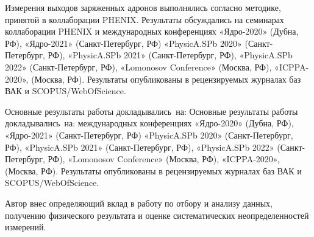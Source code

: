{\reliability} Измерения выходов заряженных адронов выполнялись согласно методике, принятой в коллаборации PHENIX. Результаты обсуждались на семинарах коллаборации PHENIX и международных конференциях «Ядро-2020» (Дубна, РФ), «Ядро-2021» (Санкт-Петербург, РФ) «PhysicA.SPb 2020» (Санкт-Петербург, РФ), «PhysicA.SPb 2021» (Санкт-Петербург, РФ), «PhysicA.SPb 2022» (Санкт-Петербург, РФ), «Lomonosov Conference» (Москва, РФ), «ICPPA-2020», (Москва, РФ). Результаты опубликованы в рецензируемых журналах баз ВАК и SCOPUS/WebOfScience.


{\probation}
Основные результаты работы докладывались~на:
Основные результаты работы докладывались~на:
международных конференциях «Ядро-2020» (Дубна, РФ), «Ядро-2021» (Санкт-Петербург, РФ) «PhysicA.SPb 2020» (Санкт-Петербург, РФ), «PhysicA.SPb 2021» (Санкт-Петербург, РФ), «PhysicA.SPb 2022» (Санкт-Петербург, РФ), «Lomonosov Conference» (Москва, РФ), «ICPPA-2020», (Москва, РФ). Результаты опубликованы в рецензируемых журналах баз ВАК и SCOPUS/WebOfScience.


{\contribution} Автор внес определяющий вклад в работу по отбору и анализу данных, получению физического результата и оценке систематических неопределенностей измерений.


